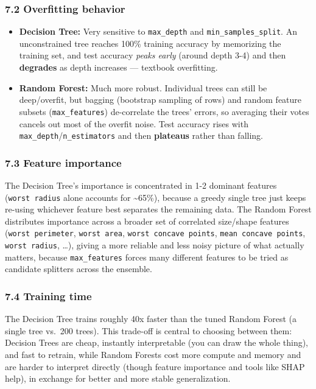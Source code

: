 \documentclass[11pt]{article}
\providecommand{\tightlist}{%
      \setlength{\itemsep}{0pt}\setlength{\parskip}{0pt}}
\begin{document}
\subsubsection{7.2 Overfitting behavior}\label{overfitting-behavior}

\begin{itemize}
\tightlist
\item
  \textbf{Decision Tree:} Very sensitive to \texttt{max\_depth} and
  \texttt{min\_samples\_split}. An unconstrained tree reaches 100\%
  training accuracy by memorizing the training set, and test accuracy
  \emph{peaks early} (around depth 3-4) and then \textbf{degrades} as
  depth increases --- textbook overfitting.
\item
  \textbf{Random Forest:} Much more robust. Individual trees can still
  be deep/overfit, but bagging (bootstrap sampling of rows) and random
  feature subsets (\texttt{max\_features}) de-correlate the trees'
  errors, so averaging their votes cancels out most of the overfit
  noise. Test accuracy rises with
  \texttt{max\_depth}/\texttt{n\_estimators} and then \textbf{plateaus}
  rather than falling.
\end{itemize}

\subsubsection{7.3 Feature importance}\label{feature-importance}

The Decision Tree's importance is concentrated in 1-2 dominant features
(\texttt{worst\ radius} alone accounts for \textasciitilde65\%), because
a greedy single tree just keeps re-using whichever feature best
separates the remaining data. The Random Forest distributes importance
across a broader set of correlated size/shape features
(\texttt{worst\ perimeter}, \texttt{worst\ area},
\texttt{worst\ concave\ points}, \texttt{mean\ concave\ points},
\texttt{worst\ radius}, \ldots), giving a more reliable and less noisy
picture of what actually matters, because \texttt{max\_features} forces
many different features to be tried as candidate splitters across the
ensemble.

\subsubsection{7.4 Training time}\label{training-time}

The Decision Tree trains roughly 40x faster than the tuned Random Forest
(a single tree vs.~200 trees). This trade-off is central to choosing
between them: Decision Trees are cheap, instantly interpretable (you can
draw the whole thing), and fast to retrain, while Random Forests cost
more compute and memory and are harder to interpret directly (though
feature importance and tools like SHAP help), in exchange for better and
more stable generalization.
\end{document}
